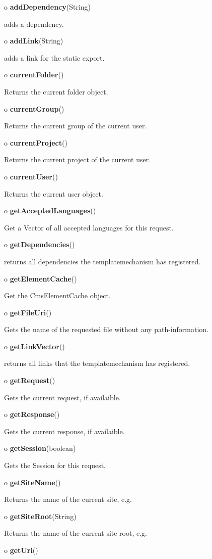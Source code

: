 \begin{description}
\item o {\bf addDependency}(String)  

adds a dependency.  
\item o {\bf addLink}(String)  

adds a link for the static export.  
\item o {\bf currentFolder}()  

Returns the current folder object.  
\item o {\bf currentGroup}()  

Returns the current group of the current user.  
\item o {\bf currentProject}()  

Returns the current project of the current user.  
\item o {\bf currentUser}()  

Returns the current user object.  
\item o {\bf getAcceptedLanguages}()  

Get a Vector of all accepted languages for this request.  
\item o {\bf getDependencies}()  

returns all dependencies the templatemechanism has registered.  
\item o {\bf getElementCache}()  

Get the CmsElementCache object.  
\item o {\bf getFileUri}()  

Gets the name of the requested file without any path-information.  
\item o {\bf getLinkVector}()  

returns all links that the templatemechanism has registered.  
\item o {\bf getRequest}()  

Gets the current request, if availaible.  
\item o {\bf getResponse}()  

Gets the current response, if availaible.  
\item o {\bf getSession}(boolean)  

Gets the Session for this request.  
\item o {\bf getSiteName}()  

Returns the name of the current site, e.g.  
\item o {\bf getSiteRoot}(String)  

Returns the name of the current site root, e.g.  
\item o {\bf getUri}()  


\end{description}
